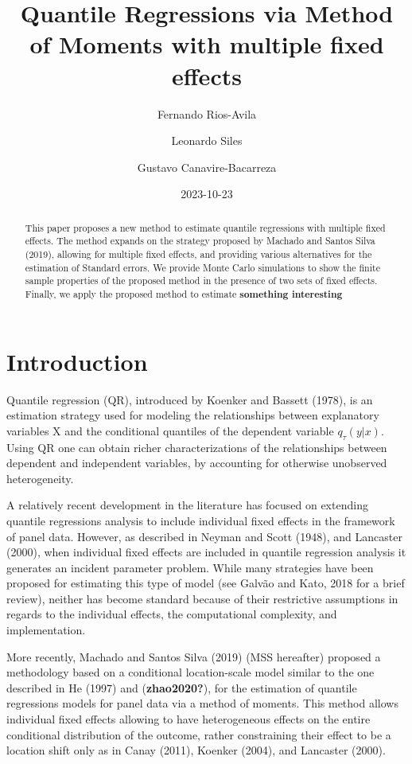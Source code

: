 \documentclass[
  letterpaper,
  DIV=11,
  numbers=noendperiod]{scrartcl}
\title{Quantile Regressions via Method of Moments with multiple fixed
effects}
\author{Fernando Rios-Avila \and Leonardo Siles \and Gustavo
Canavire-Bacarreza}
\date{2023-10-23}
\begin{document}
\maketitle
\begin{abstract}
This paper proposes a new method to estimate quantile regressions with
multiple fixed effects. The method expands on the strategy proposed by
Machado and Santos Silva (2019), allowing for multiple fixed effects,
and providing various alternatives for the estimation of Standard
errors. We provide Monte Carlo simulations to show the finite sample
properties of the proposed method in the presence of two sets of fixed
effects. Finally, we apply the proposed method to estimate
\textbf{something interesting}
\end{abstract}
\ifdefined\Shaded\renewenvironment{Shaded}{\begin{tcolorbox}[interior hidden, enhanced, sharp corners, borderline west={3pt}{0pt}{shadecolor}, frame hidden, breakable, boxrule=0pt]}{\end{tcolorbox}}\fi

\hypertarget{introduction}{%
\section{Introduction}\label{introduction}}

Quantile regression (QR), introduced by Koenker and Bassett (1978), is
an estimation strategy used for modeling the relationships between
explanatory variables X and the conditional quantiles of the dependent
variable \(q_\tau (y|x)\). Using QR one can obtain richer
characterizations of the relationships between dependent and independent
variables, by accounting for otherwise unobserved heterogeneity.

A relatively recent development in the literature has focused on
extending quantile regressions analysis to include individual fixed
effects in the framework of panel data. However, as described in Neyman
and Scott (1948), and Lancaster (2000), when individual fixed effects
are included in quantile regression analysis it generates an incident
parameter problem. While many strategies have been proposed for
estimating this type of model (see Galvão and Kato, 2018 for a brief
review), neither has become standard because of their restrictive
assumptions in regards to the individual effects, the computational
complexity, and implementation.

More recently, Machado and Santos Silva (2019) (MSS hereafter) proposed
a methodology based on a conditional location-scale model similar to the
one described in He (1997) and (\textbf{zhao2020?}), for the estimation
of quantile regressions models for panel data via a method of moments.
This method allows individual fixed effects allowing to have
heterogeneous effects on the entire conditional distribution of the
outcome, rather constraining their effect to be a location shift only as
in Canay (2011), Koenker (2004), and Lancaster (2000).
\end{document}
